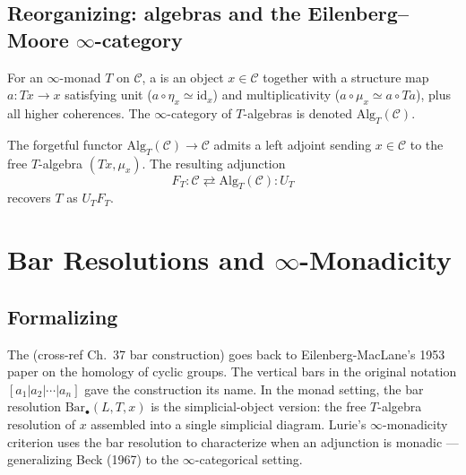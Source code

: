 \subsection{Reorganizing: algebras and the Eilenberg–Moore $\infty$-category}

\begin{definition}
\label{def:T-algebra}
For an $\infty$-monad $T$ on $\mathcal{C}$, a  is an
object $x \in \mathcal{C}$ together with a structure map $a : Tx \to x$
satisfying unit ($a \circ \eta_x \simeq \mathrm{id}_x$) and multiplicativity
($a \circ \mu_x \simeq a \circ Ta$), plus all higher coherences. The
$\infty$-category of $T$-algebras is denoted $\mathrm{Alg}_T(\mathcal{C})$.
\end{definition}

\begin{theorem}
\label{thm:free-algebras}
The forgetful functor $\mathrm{Alg}_T(\mathcal{C}) \to \mathcal{C}$ admits
a left adjoint sending $x \in \mathcal{C}$ to the free $T$-algebra
$(Tx, \mu_x)$. The resulting adjunction
\begin{equation*}
  F_T : \mathcal{C} \rightleftarrows \mathrm{Alg}_T(\mathcal{C}) : U_T
\end{equation*}
recovers $T$ as $U_T F_T$.
\end{theorem}


\section{Bar Resolutions and $\infty$-Monadicity}
\label{sec:monadicity}

\subsection{Formalizing}

\begin{nameorigin}
The  (cross-ref Ch.~37 bar construction) goes back
to Eilenberg-MacLane's 1953 paper on the homology of cyclic groups. The
vertical bars in the original notation $[a_1 | a_2 | \cdots | a_n]$
gave the construction its name. In the monad setting, the bar resolution
$\mathrm{Bar}_\bullet(L, T, x)$ is the simplicial-object version: the
free $T$-algebra resolution of $x$ assembled into a single simplicial
diagram. Lurie's $\infty$-monadicity criterion uses the bar resolution
to characterize when an adjunction is monadic — generalizing Beck
(1967) to the $\infty$-categorical setting.
\end{nameorigin}

